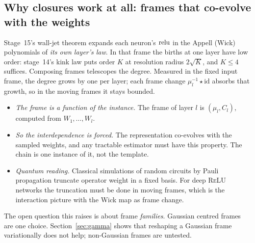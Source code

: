 \subsection{Why closures work at all: frames that co-evolve with the weights}
Stage~15's wall-jet theorem expands each neuron's $\operatorname{relu}$ in the Appell (Wick) polynomials of \emph{its own layer's law}. In that frame the
births at one layer have low order: stage~14's kink law puts order $K$ at resolution radius $2\sqrt K$, and $K\le4$ suffices. Composing frames
telescopes the degree. Measured in the fixed input frame, the degree grows by one per layer; each frame change $\mu_l^{-1}\star\mathrm{id}$ absorbs that
growth, so in the moving frames it stays bounded.
\begin{itemize}[leftmargin=*]
\item \emph{The frame is a function of the instance.} The frame of layer $l$ is $(\mu_l,C_l)$, computed from $W_1,\dots,W_l$.
\item \emph{So the interdependence is forced.} The representation co-evolves with the sampled weights, and any tractable estimator must
have this property. The chain is one instance of it, not the template.
\item \emph{Quantum reading.} Classical simulations of random circuits by Pauli propagation truncate operator weight in a fixed basis. For
deep \textsc{ReLU} networks the truncation must be done in moving frames, which is the interaction picture with the Wick map as frame
change.
\end{itemize}
The open question this raises is about frame \emph{families}. Gaussian centred frames are one choice. Section~\ref{sec:gamma} shows
that reshaping a Gaussian frame variationally does not help; non-Gaussian frames are untested.
